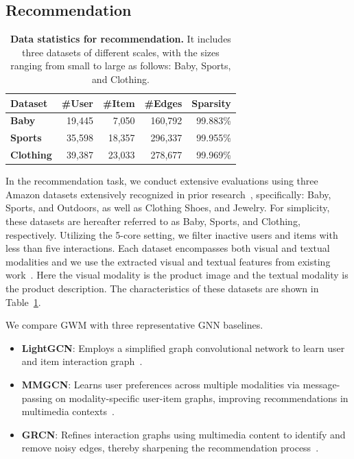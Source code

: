 \subsection{Recommendation} \label{apd:rec}

\begin{table}[ht]
	\centering
    \caption{\textbf{Data statistics for recommendation.} It includes three datasets of different scales, with the sizes ranging from small to large as follows: Baby, Sports, and Clothing.}
	\begin{tabular}{lrrrr}
		\toprule
		\textbf{Dataset} & \textbf{\#User} & \textbf{\#Item} & \textbf{\#Edges} & \textbf{Sparsity}\\
		\midrule
		\textbf{Baby} & 19,445 & 7,050 & 160,792  & 99.883\% \\
		\textbf{Sports} & 35,598 & 18,357 & 296,337  & 99.955\% \\
		\textbf{Clothing} & 39,387 & 23,033 & 278,677  & 99.969\% \\
		\bottomrule
	\end{tabular}
	\label{tab:rec_data}%
\end{table}

 In the recommendation task, we conduct extensive evaluations using three Amazon datasets extensively recognized in prior research~\citep{mcauley2015image}, specifically: Baby, Sports, and Outdoors, as well as Clothing Shoes, and Jewelry. For simplicity, these datasets are hereafter referred to as Baby, Sports, and Clothing, respectively. Utilizing the 5-core setting, we filter inactive users and items with less than five interactions. Each dataset encompasses both visual and textual modalities and we use the extracted visual and textual features from existing work~\citep{zhou2023mmrec}. Here the visual modality is the product image and the textual modality is the product description. The characteristics of these datasets are shown in Table~\ref{tab:rec_data}.


 We compare GWM with three representative GNN baselines.

 \begin{itemize}[leftmargin=1em, itemsep=0pt] 
 \item \textbf{LightGCN}: Employs a simplified graph convolutional network to learn user and item interaction graph~\citep{lightgcn}.
\item  \textbf{MMGCN}: Learns user preferences across multiple modalities via message-passing on modality-specific user-item graphs, improving recommendations in multimedia contexts~\citep{mmgcn}.

\item \textbf{GRCN}: Refines interaction graphs using multimedia content to identify and remove noisy edges, thereby sharpening the recommendation process~\citep{grcn}.

 \end{itemize} 
 







